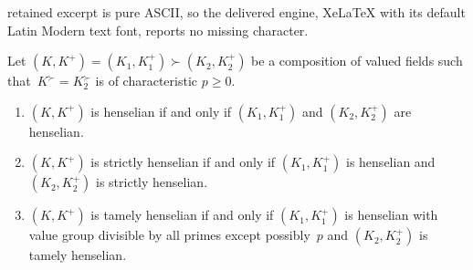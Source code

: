 \documentclass[10pt,a4paper]{amsart}
\begin{document}
retained excerpt is pure ASCII, so the delivered engine, XeLaTeX with its default Latin Modern text font, reports no missing character.
\begin{prop} \label{henselisation-composition}
    Let $(K,K^+) = (K_1,K_1^+) \succ (K_2,K_2^+)$ be a composition of valued fields such that~$K^\succ = K_2^\succ$ is of characteristic $p \ge 0$.
    \begin{enumerate}[ref=(\arabic*)]
        \item \label{lemitem:hens-comp1}
        $(K,K^+)$ is henselian if and only if $(K_1,K_1^+)$ and $(K_2,K_2^+)$ are henselian.
        \item \label{lemitem:hens-comp2}
        $(K,K^+)$ is strictly henselian if and only if $(K_1,K_1^+)$ is henselian and $(K_2,K_2^+)$ is strictly henselian.
        
        \item \label{lemitem:hens-comp3}
        $(K,K^+)$ is tamely henselian 
        if and only if $(K_1,K_1^+)$ is henselian with value group divisible by all primes except possibly~$p$ and $(K_2,K_2^+)$ is tamely henselian.
    \end{enumerate}
\end{prop}
\end{document}
